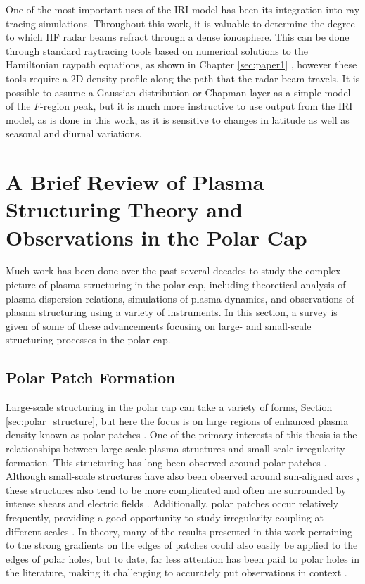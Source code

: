 One of the most important uses of the IRI model has been its integration into ray tracing simulations.  Throughout this work, it is valuable to determine the degree to which HF radar beams refract through a dense ionosphere.  This can be done through standard raytracing tools based on numerical solutions to the Hamiltonian raypath equations, as shown in Chapter \ref{sec:paper1} \citep{Haselgrove1963,Jones1975}, however these tools require a 2D density profile along the path that the radar beam travels.  It is possible to assume a Gaussian distribution or Chapman layer as a simple model of the \(F\)-region peak, but it is much more instructive to use output from the IRI model, as is done in this work, as it is sensitive to changes in latitude as well as seasonal and diurnal variations.

\section{A Brief Review of Plasma Structuring Theory and Observations in the Polar Cap}
Much work has been done over the past several decades to study the complex picture of plasma structuring in the polar cap, including theoretical analysis of plasma dispersion relations, simulations of plasma dynamics, and observations of plasma structuring using a variety of instruments.  In this section, a survey is given of some of these advancements focusing on large- and small-scale structuring processes in the polar cap.

\subsection{Polar Patch Formation}
\label{sec:lit_patches}
Large-scale structuring in the polar cap can take a variety of forms, Section \ref{sec:polar_structure}, but here the focus is on large regions of enhanced plasma density known as polar patches  \citep[e.g.][]{Weber1984,Weber1986,Buchau1983,Buchau1985}.  One of the primary interests of this thesis is the relationships between large-scale plasma structures and small-scale irregularity formation.  This structuring has long been observed around polar patches \citep{Weber1984,Milan2002b,Moen2012}.  Although small-scale structures have also been observed around sun-aligned arcs \citep[e.g.][]{Koustov2012}, these structures also tend to be more complicated and often are surrounded by intense shears and electric fields \citep{Safargaleev2000,Aikio2002,Kozlovsky2007}.  Additionally, polar patches occur relatively frequently, providing a good opportunity to study irregularity coupling at different scales \citep{Rodger1996}.  In theory, many of the results presented in this work pertaining to the strong gradients on the edges of patches could also easily be applied to the edges of polar holes, but to date, far less attention has been paid to polar holes in the literature, making it challenging to accurately put observations in context \citep{Makarevich2015b}.

